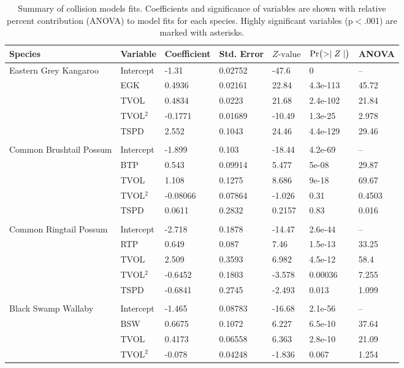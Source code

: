 \begin{table}[htp]
\caption{Summary of collision models fits. Coefficients and significance of variables are shown with relative percent contribution (ANOVA) to model fits for each species.  Highly significant variables (p$<$.001) are marked with asterisks.}
\begin{tabularx}{\textwidth}{lllllll} \toprule
Species & Variable & Coefficient & Std. Error & $Z\text{-value}$ & $\text{Pr}\bigl( >\mid Z \mid \bigr)$ & ANOVA \\ 
\midrule
Eastern Grey Kangaroo & Intercept & -1.31 & 0.02752 & -47.6 & 0 & -- \\ 
   & EGK & 0.4936 & 0.02161 & 22.84 & 4.3e-113 & 45.72 \\ 
   & TVOL & 0.4834 & 0.0223 & 21.68 & 2.4e-102 & 21.84 \\ 
   & TVOL$^2$ & -0.1771 & 0.01689 & -10.49 & 1.3e-25 & 2.978 \\ 
   & TSPD & 2.552 & 0.1043 & 24.46 & 4.4e-129 & 29.46 \\ 
   &  &  &  &  &  &  \\ 
Common Brushtail Possum & Intercept & -1.899 & 0.103 & -18.44 & 4.2e-69 & -- \\ 
   & BTP & 0.543 & 0.09914 & 5.477 & 5e-08 & 29.87 \\ 
   & TVOL & 1.108 & 0.1275 & 8.686 & 9e-18 & 69.67 \\ 
   & TVOL$^2$ & -0.08066 & 0.07864 & -1.026 & 0.31 & 0.4503 \\ 
   & TSPD & 0.0611 & 0.2832 & 0.2157 & 0.83 & 0.016 \\ 
   &  &  &  &  &  &  \\ 
Common Ringtail Possum & Intercept & -2.718 & 0.1878 & -14.47 & 2.6e-44 & -- \\ 
   & RTP & 0.649 & 0.087 & 7.46 & 1.5e-13 & 33.25 \\ 
   & TVOL & 2.509 & 0.3593 & 6.982 & 4.5e-12 & 58.4 \\ 
   & TVOL$^2$ & -0.6452 & 0.1803 & -3.578 & 0.00036 & 7.255 \\ 
   & TSPD & -0.6841 & 0.2745 & -2.493 & 0.013 & 1.099 \\ 
   &  &  &  &  &  &  \\ 
Black Swamp Wallaby & Intercept & -1.465 & 0.08783 & -16.68 & 2.1e-56 & -- \\ 
   & BSW & 0.6675 & 0.1072 & 6.227 & 6.5e-10 & 37.64 \\ 
   & TVOL & 0.4173 & 0.06558 & 6.363 & 2.8e-10 & 21.09 \\ 
   & TVOL$^2$ & -0.078 & 0.04248 & -1.836 & 0.067 & 1.254 \\ 

\end{tabularx}
\end{table}
